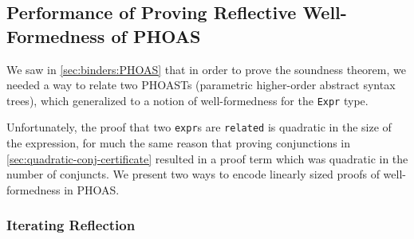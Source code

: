 \subsection{Performance of Proving Reflective Well-Formedness of PHOAS} \label{sec:wf:perf}

We saw in \autoref{sec:binders:PHOAS} that in order to prove the soundness theorem, we needed a way to relate two PHOASTs (parametric higher-order abstract syntax trees), which generalized to a notion of well-formedness for the \texttt{Expr} type.

Unfortunately, the proof that two \texttt{expr}s are \texttt{related} is quadratic in the size of the expression, for much the same reason that proving conjunctions in \autoref{sec:quadratic-conj-certificate} resulted in a proof term which was quadratic in the number of conjuncts.
We present two ways to encode linearly sized proofs of well-formedness in PHOAS.

\subsubsection{Iterating Reflection} \label{sec:wf:perf:reflective}

